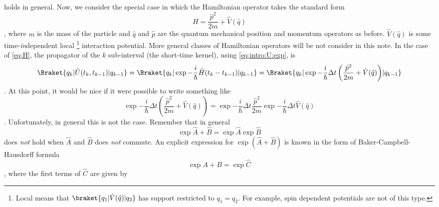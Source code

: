  holds in general. Now, we consider the special case in
which  the
Hamiltonian operator takes the standard form 
\begin{dmath}[label={H}]
\hat{H} = \frac{\hat{p}^{2}}{2m} + \hat{V} (\hat{q}) 
\end{dmath},
where
$m$ is the mass of the particle and 
$\hat{q}$ and $\hat{p}$ are the quantum
mechanical position and momentum operators as before.
$\hat{V}(\hat{q})$ is some time-\emph{in}dependent local%
\footnote{Local means that  $\braket{q_{1} | \hat{V}(\hat{q})|q_{2}}$ has
support restricted to $q_{1} = q_{2}$. For example, spin dependent potentials
are not of this type.} interaction potential.
More general classes of Hamiltonian operators will be not consider in this note.
In the case of \cref{eq:H}, the propagator of the $k$\ordth{} sub-interval (the
short-time kernel), using \cref{eq:intro:U:exp}, is
\begin{dmath*}
\Braket{q_{k} | \hat{U}(t_{k}, t_{k-1}) | q_{k-1}} =
 \Braket{q_{k} | \exp{-\frac{i}{\hslash} \hat{H} (t_{k} - t_{k-1}) } | q_{k-1}}
=
\Braket{ q_{k} | \exp{- \frac{i}{\hslash} \Delta t \left(
	 \frac{\hat{p}^{2}}{2m}+
\hat{V}(\hat{q}) \right) } | q_{k-1}} 
\end{dmath*}.
At this point, it would be nice if it were possible to write something like
\begin{dmath*}
   \exp{- \frac{i}{\hslash} \Delta t \left( \frac{\hat{p}^{2}}{2m} +  \hat{V}(\hat{q})
      \right)} = 
   \exp{- \frac{i}{\hslash} \Delta t  \frac{\hat{p}^{2}}{2m}}
   \exp{- \frac{i}{\hslash} \Delta t \hat{V}(\hat{q})}
\end{dmath*}.
Unfortunately, in general this is not the case.
Remember that in general
\begin{dmath*}
\exp{\hat{A}+\hat{B}} = \exp{\hat{A}} \exp{\hat{B}} 
\end{dmath*}
does \emph{not} hold when $\hat{A}$ and $\hat{B}$ does \emph{not} commute.
An explicit expression for $\exp \left( \hat{A}+\hat{B}\right)$ is known in the form of 
Baker-Campbell-Hausdorff formula
\begin{dmath*}
\exp{A+B} = \exp{\hat{C}} 
\end{dmath*},
where the first terms of $\hat{C}$ are given by 


